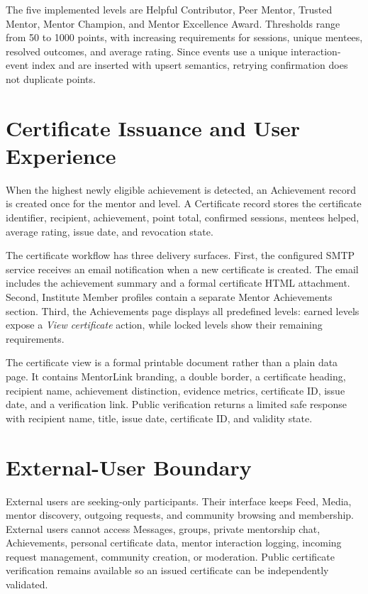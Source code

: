 \documentclass[conference]{IEEEtran}
\begin{document}
The five implemented levels are Helpful Contributor, Peer Mentor, Trusted Mentor, Mentor Champion, and Mentor Excellence Award. Thresholds range from 50 to 1000 points, with increasing requirements for sessions, unique mentees, resolved outcomes, and average rating. Since events use a unique interaction-event index and are inserted with upsert semantics, retrying confirmation does not duplicate points.

\section{Certificate Issuance and User Experience}
When the highest newly eligible achievement is detected, an Achievement record is created once for the mentor and level. A Certificate record stores the certificate identifier, recipient, achievement, point total, confirmed sessions, mentees helped, average rating, issue date, and revocation state.

The certificate workflow has three delivery surfaces. First, the configured SMTP service receives an email notification when a new certificate is created. The email includes the achievement summary and a formal certificate HTML attachment. Second, Institute Member profiles contain a separate Mentor Achievements section. Third, the Achievements page displays all predefined levels: earned levels expose a \textit{View certificate} action, while locked levels show their remaining requirements.

The certificate view is a formal printable document rather than a plain data page. It contains MentorLink branding, a double border, a certificate heading, recipient name, achievement distinction, evidence metrics, certificate ID, issue date, and a verification link. Public verification returns a limited safe response with recipient name, title, issue date, certificate ID, and validity state.

\section{External-User Boundary}
External users are seeking-only participants. Their interface keeps Feed, Media, mentor discovery, outgoing requests, and community browsing and membership. External users cannot access Messages, groups, private mentorship chat, Achievements, personal certificate data, mentor interaction logging, incoming request management, community creation, or moderation. Public certificate verification remains available so an issued certificate can be independently validated.
\end{document}
